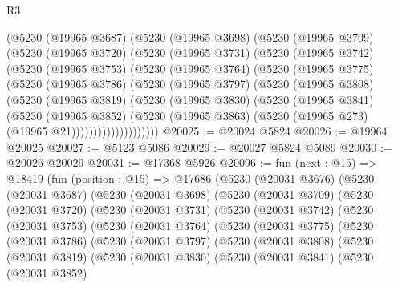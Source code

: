 \begin{lexlean}{R3}
\begin{coremodule}
      (@5230
        (@19965 @3687)
        (@5230
          (@19965 @3698)
          (@5230
            (@19965 @3709)
            (@5230
              (@19965 @3720)
              (@5230
                (@19965 @3731)
                (@5230
                  (@19965 @3742)
                  (@5230
                    (@19965 @3753)
                    (@5230
                      (@19965 @3764)
                      (@5230
                        (@19965 @3775)
                        (@5230
                          (@19965 @3786)
                          (@5230
                            (@19965 @3797)
                            (@5230
                              (@19965 @3808)
                              (@5230
                                (@19965 @3819)
                                (@5230
                                  (@19965 @3830)
                                  (@5230
                                    (@19965 @3841)
                                    (@5230
                                      (@19965 @3852)
                                      (@5230
                                        (@19965 @3863)
                                        (@5230 (@19965 @273) (@19965 @21))))))))))))))))))))
@20025 := @20024 @5824
@20026 := @19964 @20025
@20027 := @5123 @5086
@20029 := @20027 @5824 @5089
@20030 := @20026 @20029
@20031 := @17368 @5926
@20096 := fun (next : @15) =>
  @18419
    (fun (position : @15) =>
    @17686
      (@5230
        (@20031 @3676)
        (@5230
          (@20031 @3687)
          (@5230
            (@20031 @3698)
            (@5230
              (@20031 @3709)
              (@5230
                (@20031 @3720)
                (@5230
                  (@20031 @3731)
                  (@5230
                    (@20031 @3742)
                    (@5230
                      (@20031 @3753)
                      (@5230
                        (@20031 @3764)
                        (@5230
                          (@20031 @3775)
                          (@5230
                            (@20031 @3786)
                            (@5230
                              (@20031 @3797)
                              (@5230
                                (@20031 @3808)
                                (@5230
                                  (@20031 @3819)
                                  (@5230
                                    (@20031 @3830)
                                    (@5230
                                      (@20031 @3841)
                                      (@5230
                                        (@20031 @3852)

\end{coremodule}
\end{lexlean}
